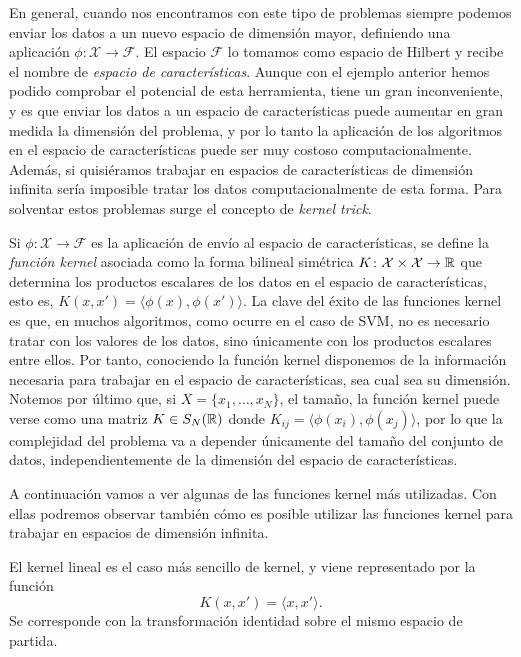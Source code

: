 \documentclass{book}
\begin{document}
En general, cuando nos encontramos con este tipo de problemas siempre podemos enviar los datos a un nuevo espacio de dimensión mayor, definiendo una aplicación $\phi\colon \mathcal{X} \to \mathcal{F}$. El espacio $\mathcal{F}$ lo tomamos como espacio de Hilbert y recibe el nombre de \emph{espacio de características}. Aunque con el ejemplo anterior hemos podido comprobar el potencial de esta herramienta, tiene un gran inconveniente, y es que enviar los datos a un espacio de características puede aumentar en gran medida la dimensión del problema, y por lo tanto la aplicación de los algoritmos en el espacio de características puede ser muy costoso computacionalmente. Además, si quisiéramos trabajar en espacios de características de dimensión infinita sería imposible tratar los datos computacionalmente de esta forma. Para solventar estos problemas surge el concepto de \emph{kernel trick}.

Si $\phi\colon \mathcal{X} \to \mathcal{F}$ es la aplicación de envío al espacio de características, se define la \emph{función kernel} asociada como la forma bilineal simétrica $K \colon \mathcal{X} \times \mathcal{X} \to \mathbb{R}$ que determina los productos escalares de los datos en el espacio de características, esto es,
$K(x,x') = \langle \phi(x), \phi(x') \rangle$. La clave del éxito de las funciones kernel es que, en muchos algoritmos, como ocurre en el caso de SVM, no es necesario tratar con los valores de los datos, sino únicamente con los productos escalares entre ellos. Por tanto, conociendo la función kernel disponemos de la información necesaria para trabajar en el espacio de características, sea cual sea su dimensión. Notemos por último que, si $X = \{x_1,\dots,x_N\}$, el tamaño, la función kernel puede verse como una matriz $K \in S_N(\mathbb{R})$ donde $K_{ij} = \langle \phi(x_i), \phi(x_j) \rangle$, por lo que la complejidad del problema va a depender únicamente del tamaño del conjunto de datos, independientemente de la dimensión del espacio de características.

A continuación vamos a ver algunas de las funciones kernel más utilizadas. Con ellas podremos observar también cómo es posible utilizar las funciones kernel para trabajar en espacios de dimensión infinita.

\begin{ex}
	El kernel lineal es el caso más sencillo de kernel, y viene representado por la función
	\[ K(x,x') = \langle x, x' \rangle. \]
	Se corresponde con la transformación identidad sobre el mismo espacio de partida.
\end{ex}
\end{document}
